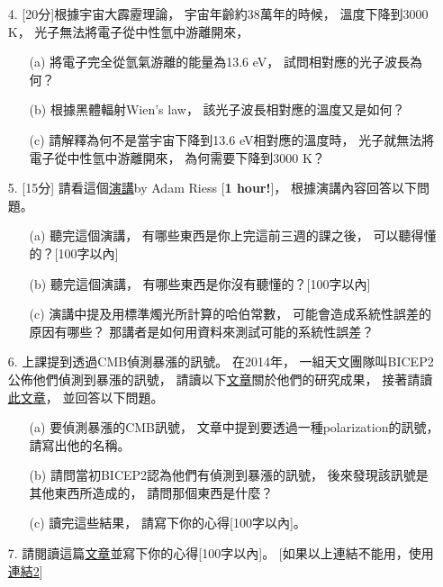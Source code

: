 \documentclass{article}
\theoremstyle{definition}
\begin{document}
\begin{enumerate}
	\item[4.] [20分]根據宇宙大霹靂理論，
		宇宙年齡約38萬年的時候，
		溫度下降到3000 K，
		光子無法將電子從中性氫中游離開來，
		
		\begin{enumerate}
			\item[(a)] 將電子完全從氫氣游離的能量為13.6 eV，
				試問相對應的光子波長為何？

			\item[(b)] 根據黑體輻射Wien's law，
				該光子波長相對應的溫度又是如何？

			\item[(c)] 請解釋為何不是當宇宙下降到13.6 eV相對應的溫度時，
				光子就無法將電子從中性氫中游離開來，
				為何需要下降到3000 K？

		\end{enumerate}

	\item[5.] [15分] 請看這個\href{https://www.youtube.com/watch?v=JmDszPExepc&ab_channel=issiber}{演講}by Adam Riess [\textbf{1 hour!}]，
		根據演講內容回答以下問題。

		\begin{enumerate}
			\item[(a)] 聽完這個演講，
				有哪些東西是你上完這前三週的課之後，
				可以聽得懂的？[100字以內]

			\item[(b)] 聽完這個演講，
				有哪些東西是你沒有聽懂的？[100字以內]

			\item[(c)] 演講中提及用標準燭光所計算的哈伯常數，
				可能會造成系統性誤差的原因有哪些？
				那講者是如何用資料來測試可能的系統性誤差？

		\end{enumerate}

	\item[6.] 上課提到透過CMB偵測暴漲的訊號。
		在2014年，
		一組天文團隊叫BICEP2公佈他們偵測到暴漲的訊號，
		請讀以下\href{https://www.youtube.com/watch?v=JmDszPExepc&ab_channel=issiber}{文章}關於他們的研究成果，
		接著請讀\href{https://phys.org/news/2015-02-cosmic-inflation-bicep2-results.html}{此文章}，
		並回答以下問題。
		\begin{enumerate}
			
			\item[(a)] 要偵測暴漲的CMB訊號，
				文章中提到要透過一種polarization的訊號，
				請寫出他的名稱。

			\item[(b)] 請問當初BICEP2認為他們有偵測到暴漲的訊號，
				後來發現該訊號是其他東西所造成的，
				請問那個東西是什麼？

			\item[(c)] 讀完這些結果，
				請寫下你的心得[100字以內]。
		\end{enumerate}

	\item[7.] 請閱讀這篇\href{https://calteches.library.caltech.edu/638/2/Men.pdf}{文章}並寫下你的心得[100字以內]。
		[如果以上連結不能用，使用\href{https://www.dropbox.com/s/yggx7xfldi5fefj/prime_focus_cage_men.pdf}{連結2}]

\end{enumerate}
\end{document}
